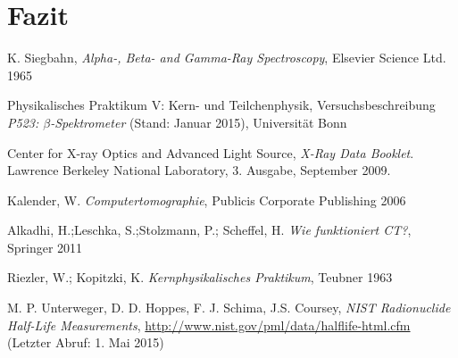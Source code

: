 \documentclass[11pt, a4paper]{article}
\numberwithin{equation}{section}
\begin{document}
\section{Fazit}

\FloatBarrier
\vspace{\fill}
\begin{thebibliography}{19}
	K. Siegbahn,
	\emph{Alpha-, Beta- and Gamma-Ray Spectroscopy},
	Elsevier Science Ltd. 1965

	Physikalisches Praktikum V: Kern- und Teilchenphysik,
	Versuchsbeschreibung \emph{P523: $\beta$-Spektrometer} (Stand: Januar 2015),
	Universität Bonn	

	Center for X-ray Optics and Advanced Light Source,
	\emph{X-Ray Data Booklet}.
	Lawrence Berkeley National Laboratory,
	3. Ausgabe,
	September 2009.
	
	Kalender, W.
	\emph{Computertomographie},
	Publicis Corporate Publishing 2006
	
	Alkadhi, H.;Leschka, S.;Stolzmann, P.; Scheffel, H.
	\emph{Wie funktioniert CT?},
	Springer 2011

	Riezler, W.; Kopitzki, K.
	\emph{Kernphysikalisches Praktikum},
	Teubner 1963

	M. P. Unterweger, D. D. Hoppes, F. J. Schima, J.S. Coursey,
	\emph{NIST Radionuclide Half-Life Measurements},
	\url{http://www.nist.gov/pml/data/halflife-html.cfm} (Letzter Abruf: 1. Mai 2015)

\end{thebibliography}
\end{document}
